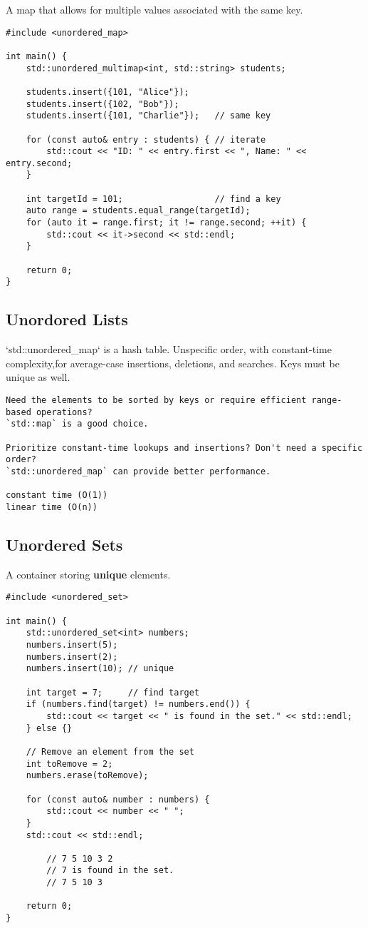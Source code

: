 A map that allows for multiple values associated with the same key. 

\begin{verbatim}
#include <unordered_map>

int main() {
    std::unordered_multimap<int, std::string> students;

    students.insert({101, "Alice"});
    students.insert({102, "Bob"});
    students.insert({101, "Charlie"});   // same key

    for (const auto& entry : students) { // iterate 
        std::cout << "ID: " << entry.first << ", Name: " << entry.second;
    }

    int targetId = 101;                  // find a key
    auto range = students.equal_range(targetId);
    for (auto it = range.first; it != range.second; ++it) { 
        std::cout << it->second << std::endl;
    }

    return 0;
}
\end{verbatim}

\subsection{Unordored Lists}

`std::unordered\_map` is a hash table. 
Unspecific order, with constant-time complexity,for average-case 
insertions, deletions, and searches. 
Keys must be unique as well.

\begin{verbatim}
Need the elements to be sorted by keys or require efficient range-based operations?
`std::map` is a good choice.

Prioritize constant-time lookups and insertions? Don't need a specific order? 
`std::unordered_map` can provide better performance.

constant time (O(1)) 
linear time (O(n))
\end{verbatim}

\subsection{Unordered Sets}

A container storing \textbf{unique} elements.

\begin{verbatim}
#include <unordered_set>

int main() {
    std::unordered_set<int> numbers;
    numbers.insert(5);
    numbers.insert(2);
    numbers.insert(10); // unique

    int target = 7;     // find target
    if (numbers.find(target) != numbers.end()) {
        std::cout << target << " is found in the set." << std::endl;
    } else {}

    // Remove an element from the set
    int toRemove = 2;
    numbers.erase(toRemove);

    for (const auto& number : numbers) {
        std::cout << number << " ";
    }
    std::cout << std::endl;

        // 7 5 10 3 2
        // 7 is found in the set.
        // 7 5 10 3

    return 0;
}
\end{verbatim}

